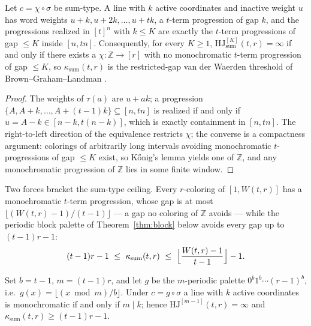 \documentclass[12pt]{article}
\newcommand{\HJ}{\mathrm{HJ}}
\newcommand{\Wvdw}{W}
\newcommand{\Z}{\mathbb{Z}}
\newcommand{\ksum}{\kappa_{\mathrm{sum}}}
\begin{document}
\begin{lemma}\label{lem:1d}
Let $c=\chi\circ\sigma$ be sum-type. A line with $k$ active
coordinates and inactive weight $u$ has word weights
$u+k,u+2k,\dots,u+tk$, a $t$-term progression of gap $k$, and the
progressions realized in $[t]^{n}$ with $k\le K$ are exactly the
$t$-term progressions of gap $\le K$ inside $[n,tn]$. Consequently, for
every $K\ge 1$, $\HJ^{[K]}_{\mathrm{sum}}(t,r)=\infty$ if and only if
there exists a $\chi\colon\Z\to[r]$ with no monochromatic $t$-term
progression of gap $\le K$, so $\ksum(t,r)$ is the restricted-gap van
der Waerden threshold of Brown--Graham--Landman \cite{BGL1999}.
\end{lemma}

\begin{proof}
The weights of $\tau(a)$ are $u+ak$; a progression
$\{A,A+k,\dots,A+(t-1)k\}\subseteq[n,tn]$ is realized if and only if
$u=A-k\in[n-k,t(n-k)]$, which is exactly containment in $[n,tn]$. The
right-to-left direction of the equivalence restricts $\chi$; the
converse is a compactness argument: colorings of arbitrarily long
intervals avoiding monochromatic $t$-progressions of gap $\le K$
exist, so K\H{o}nig's lemma yields one of $\Z$, and any monochromatic
progression of $\Z$ lies in some finite window.
\end{proof}

Two forces bracket the sum-type ceiling. Every $r$-coloring of
$[1,\Wvdw(t,r)]$ has a monochromatic $t$-term progression, whose gap is
at most $\lfloor(\Wvdw(t,r)-1)/(t-1)\rfloor$ --- a gap no coloring of
$\Z$ avoids --- while the periodic block palette of
Theorem~\ref{thm:block} below avoids every gap up to $(t-1)r-1$:
\begin{equation}\label{eq:kstar-bounds}
(t-1)r-1\ \le\ \ksum(t,r)\ \le\
\Bigl\lfloor\frac{\Wvdw(t,r)-1}{t-1}\Bigr\rfloor-1 .
\end{equation}

\begin{theorem}\label{thm:block}
Set $b=t-1$, $m=(t-1)r$, and let $g$ be the $m$-periodic palette
$0^{b}1^{b}\cdots(r-1)^{b}$, i.e.\
$g(x)=\lfloor(x\bmod m)/b\rfloor$. Under $c=g\circ\sigma$ a line with
$k$ active coordinates is monochromatic if and only if $m\mid k$; hence
$\HJ^{[m-1]}(t,r)=\infty$ and $\ksum(t,r)\ge(t-1)r-1$.
\end{theorem}
\end{document}
